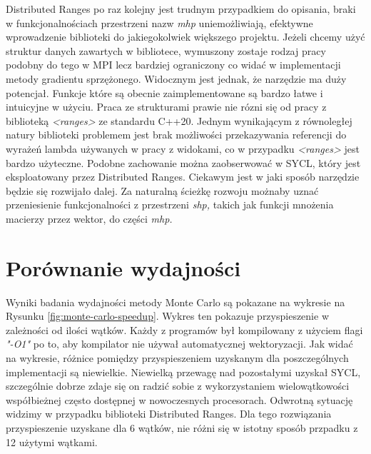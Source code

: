 \documentclass[a4paper,12pt]{book} %
\begin{document}
Distributed Ranges po raz kolejny jest trudnym przypadkiem do opisania, braki w funkcjonalnościach przestrzeni nazw \emph{mhp} uniemożliwiają, efektywne wprowadzenie biblioteki do jakiegokolwiek większego projektu. Jeżeli chcemy użyć struktur danych zawartych w bibliotece, wymuszony zostaje rodzaj pracy podobny do tego w MPI lecz bardziej ograniczony co widać w implementacji metody gradientu sprzężonego. Widocznym jest jednak, że narzędzie ma duży potencjał. Funkcje które są obecnie zaimplementowane są bardzo łatwe i intuicyjne w użyciu. Praca ze strukturami prawie nie rózni się od pracy z biblioteką \emph{<ranges>} ze standardu C++20. Jednym wynikającym z równoległej natury biblioteki problemem jest brak możliwości przekazywania referencji do wyrażeń lambda używanych w pracy z widokami, co w przypadku \emph{<ranges>} jest bardzo użyteczne. Podobne zachowanie można zaobserwować w SYCL, który jest eksploatowany przez Distributed Ranges. Ciekawym jest w jaki sposób narzędzie będzie się rozwijało dalej. Za naturalną ścieżkę rozwoju możnaby uznać przeniesienie funkcjonalności z przestrzeni \emph{shp,} takich jak funkcji mnożenia macierzy przez wektor, do części \emph{mhp.}

\chapter{Porównanie wydajności}
Wyniki badania wydajności metody Monte Carlo są pokazane na wykresie na Rysunku \ref{fig:monte-carlo-speedup}. Wykres ten pokazuje przyspieszenie w zależności od ilości wątków. Każdy z programów był kompilowany z użyciem flagi \emph{"-O1"} po to, aby kompilator nie używał automatycznej wektoryzacji. Jak widać na wykresie, różnice pomiędzy przyspieszeniem uzyskanym dla poszczególnych implementacji są niewielkie. Niewielką przewagę nad pozostałymi uzyskał SYCL, szczególnie dobrze zdaje się on radzić sobie z wykorzystaniem wielowątkowości współbieżnej często dostępnej w nowoczesnych procesorach. Odwrotną sytuację widzimy w przypadku biblioteki Distributed Ranges. Dla tego rozwiązania przyspieszenie uzyskane dla 6 wątków, nie różni się w istotny sposób przpadku z 12 użytymi wątkami.
\end{document}
